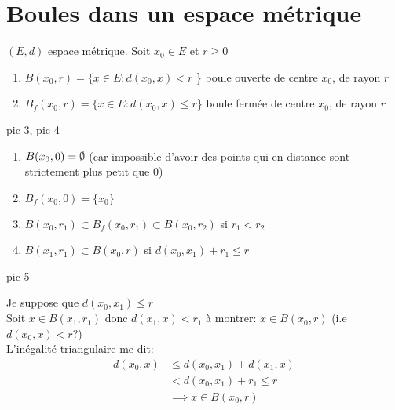 \documentclass[a4paper]{report}
\begin{document}
\section{Boules dans un espace métrique}
\begin{definition}
    $(E, d)$ espace métrique. Soit  $x_0 \in E$ et $r \ge  0$
    \begin{enumerate}
        \item $B(x_0, r) = \{ x \in E: d(x_0, x) < r$ \} boule ouverte de centre $x_0$, de rayon $r$
        \item $B_f(x_0, r) = \{ x \in E: d(x_0, x) \le  r$\} boule fermée de centre $x_0$, de rayon $r$
    \end{enumerate}
\end{definition}
pic 3, pic 4
\begin{lemma}
   \begin{enumerate}
       \item $B(x_0, 0) = \emptyset$ (car impossible d'avoir des points qui en distance sont strictement plus petit que 0)
       \item $B_f(x_0, 0) = \{x_0\}$
       \item $B(x_0, r_1) \subset B_f(x_0, r_1) \subset B(x_0, r_2)$ si $r_1 < r_2$
       \item $B(x_1, r_1) \subset B(x_0, r)$ si  $d(x_0, x_1) + r_1 \le r$
   \end{enumerate} 
   pic 5
\end{lemma}
\begin{explanation}
   Je suppose que $d(x_0, x_1) \le r$\\ 
   Soit $x \in B(x_1, r_1)$ donc $d(x_1, x) < r_1$ à montrer: $x \in B(x_0, r)$ (i.e $d(x_0, x) < r$?)\\
   L'inégalité triangulaire me dit:
   \begin{align*}
       d(x_0, x) &\le d(x_0, x_1) + d(x_1, x)\\
                 &< d(x_0, x_1) + r_1 \le r\\
                 &\implies x \in B(x_0, r)
   \end{align*}
\end{explanation}
\end{document}
